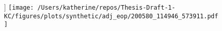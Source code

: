 \begin{figure}[h]]
\centering
\texttt{[image: /Users/katherine/repos/Thesis-Draft-1-KC/figures/plots/synthetic/adj\_eop/200580\_114946\_573911.pdf]}
\caption{}
\label{fig:}
\end{figure}
